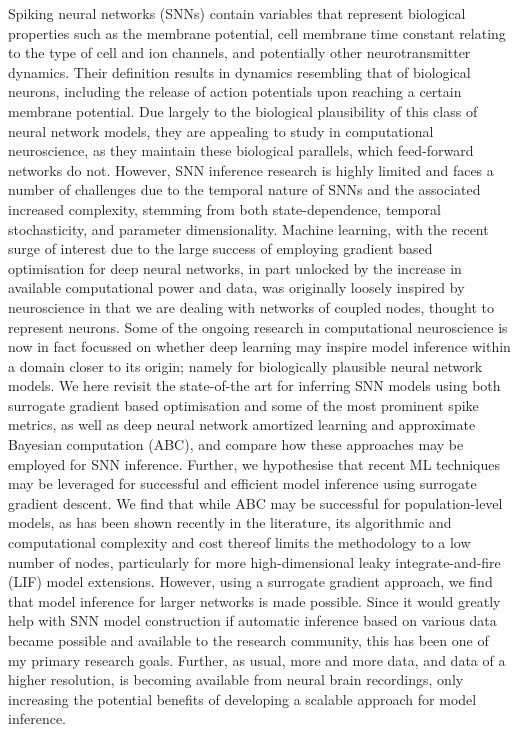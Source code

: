 \documentclass[mphil,deptreport,ai]{infthesis} %
\begin{document}
Spiking neural networks (SNNs) contain variables that represent biological properties such as the membrane potential, cell membrane time constant relating to the type of cell and ion channels, and potentially other neurotransmitter dynamics. Their definition results in dynamics resembling that of biological neurons, including the release of action potentials upon reaching a certain membrane potential.
Due largely to the biological plausibility of this class of neural network models, they are appealing to study in computational neuroscience, as they maintain these biological parallels, which feed-forward networks  do not.
However, SNN inference research is highly limited and faces a number of challenges due to the temporal nature of SNNs and the associated increased complexity, stemming from both state-dependence, temporal stochasticity, and parameter dimensionality.
Machine learning, with the recent surge of interest due to the large success of employing gradient based optimisation for deep neural networks, in part unlocked by the increase in available computational power and data, was originally loosely inspired by neuroscience in that we are dealing with networks of coupled nodes, thought to represent neurons.
Some of the ongoing research in computational neuroscience is now in fact focussed on whether deep learning may inspire model inference within a domain closer to its origin; namely for biologically plausible neural network models.
We here revisit the state-of-the art for inferring SNN models using both surrogate gradient based optimisation and some of the most prominent spike metrics, as well as deep neural network amortized learning and approximate Bayesian computation (ABC), and compare how these approaches may be employed for SNN inference. Further, we hypothesise that recent ML techniques may be leveraged for successful and efficient model inference using surrogate gradient descent.
We find that while ABC may be successful for population-level models, as has been shown recently in the literature, its algorithmic and computational complexity and cost thereof limits the methodology to a low number of nodes, particularly for more high-dimensional leaky integrate-and-fire (LIF) model extensions.
However, using a surrogate gradient approach, we find that model inference for larger networks is made possible. 
Since it would greatly help with SNN model construction if automatic inference based on various data became possible and available to the research community, this has been one of my primary research goals.
Further, as usual, more and more data, and data of a higher resolution, is becoming available from neural brain recordings, only increasing the potential benefits of developing a scalable approach for model inference.
\end{document}
